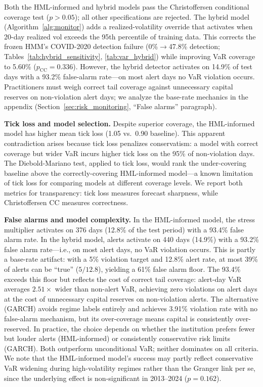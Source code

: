 \documentclass{uai2026}
\begin{document}
Both the HML-informed and hybrid models pass the Christoffersen conditional
coverage test ($p > 0.05$); all other specifications are rejected. The hybrid
model (Algorithm~\ref{alg:monitor}) adds a realized-volatility override that
activates when 20-day realized vol exceeds the 95th percentile of training
data. This corrects the frozen HMM's COVID-2020 detection failure
(0\%$\to$47.8\% detection; Tables~\ref{tab:hybrid_sensitivity},
\ref{tab:var_hybrid}) while improving VaR coverage to 5.60\%
($p_{\text{CC}} = 0.336$). However, the hybrid detector activates on 14.9\% of
test days with a 93.2\% false-alarm rate---on most alert days no VaR violation
occurs. Practitioners must weigh correct tail coverage against unnecessary capital
reserves on non-violation alert days; we analyze the base-rate mechanics in the
appendix (Section~\ref{sec:risk_monitoring}, ``False alarms'' paragraph).

\textbf{Tick loss and model selection.}
Despite superior coverage, the HML-informed model has higher mean tick loss
(1.05 vs.\ 0.90 baseline). This apparent contradiction arises because tick loss
penalizes conservatism: a model with correct coverage but wider VaR incurs higher
tick loss on the 95\% of non-violation days. The Diebold-Mariano test, applied to
tick loss, would rank the under-covering baseline above the correctly-covering
HML-informed model---a known limitation of tick loss for comparing models at
different coverage levels. We report both metrics for transparency: tick loss
measures forecast sharpness, while Christoffersen CC measures correctness.

\textbf{False alarms and model complexity.}
In the HML-informed model, the stress multiplier activates on 376 days
(12.8\% of the test period) with a 93.4\% false alarm rate. In the hybrid model,
alerts activate on 440 days (14.9\%) with a 93.2\% false alarm rate---i.e., on
most alert days, no VaR violation occurs.
This is partly a base-rate artifact: with a 5\% violation target and 12.8\%
alert rate, at most 39\% of alerts can be ``true'' ($5/12.8$), yielding a
61\% false alarm floor. The 93.4\% exceeds this floor but reflects the cost
of correct tail coverage: alert-day VaR averages $2.51\times$ wider than
non-alert VaR, achieving zero violations on alert days at the cost of
unnecessary capital reserves on non-violation alerts.
The alternative (GARCH) avoids regime labels entirely and achieves
3.91\% violation rate with no false-alarm mechanism, but its over-coverage means
capital is consistently over-reserved. In practice, the choice depends on whether
the institution prefers fewer but louder alerts (HML-informed) or consistently
conservative risk limits (GARCH). Both outperform unconditional VaR; neither
dominates on all criteria.
We note that the HML-informed model's success may partly reflect conservative
VaR widening during high-volatility regimes rather than the Granger link per se,
since the underlying effect is non-significant in 2013--2024 ($p = 0.162$).
\end{document}
